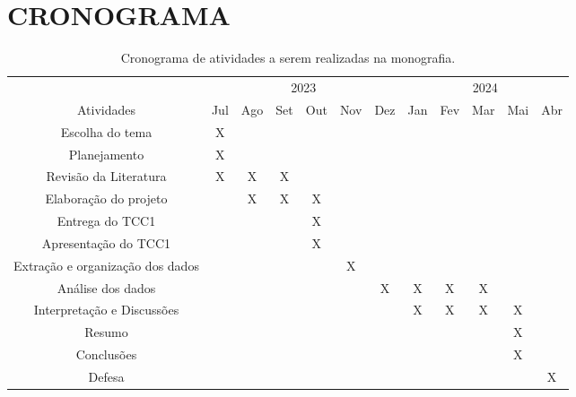 \chapter{CRONOGRAMA}


\begin{table}[!htb]\centering 
	\caption{Cronograma de atividades a serem realizadas na monografia.}
	\begin{tabular}{c|c|c|c|c|c|c|c|c|c|c|c}\hline 
		& \multicolumn{6}{c|}{2023}      & \multicolumn{5}{c}{2024} \\ \cline{2-12} 
	\multirow[c]{-2}{*}{Atividades}	& Jul & Ago & Set & Out & Nov & Dez & Jan & Fev & Mar & Mai  & Abr \\ 
	\hline 	Escolha do tema	& X &   &   &   &   &   &   &   &   &    &  \\ 
	\hline  Planejamento & X &   &   &   &   &   &   &   &   &    &  \\ 
	\hline  Revisão da Literatura & X & X  &  X &   &   &   &   &   &   &    &  \\ 
	\hline  Elaboração do projeto &  &  X  & X  & X  &   &   &   &   &   &    &  \\ 
	\hline  Entrega do TCC1 &  &   &   & X  &   &   &   &   &   &    &  \\ 
	\hline  Apresentação do TCC1 &  &   &   &  X &   &   &   &   &   &    &  \\ 
	\hline  Extração e organização dos dados &  &   &   &   & X  &   &   &   &   &    &  \\ 
	\hline  Análise dos dados &  &   &   &   &   &  X & X  & X  &  X &    &  \\ 
	\hline  Interpretação e Discussões &  &   &   &   &   &   &  X &  X &  X &  X  &  \\ 
	\hline  Resumo &  &   &   &   &   &   &   &   &   &  X  &  \\ 
	\hline  Conclusões &  &   &   &   &   &   &   &   &   &  X  &  \\ 
	\hline  Defesa &  &   &   &   &   &   &   &   &   &    & X  \\ 
	\hline 
	\end{tabular} 
	\label{tab:Crono} 
\end{table} 


